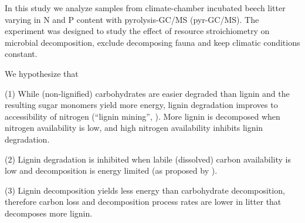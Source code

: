 \documentclass[authoryear,preprint,review,12pt]{elsarticle}
\begin{document}


In this study we analyze samples from climate-chamber incubated beech litter varying in N and P content with pyrolysis-GC/MS (pyr-GC/MS). The experiment was designed to study the effect of resource stroichiometry on microbial decomposition, exclude decomposing fauna and keep climatic conditions constant.

We hypothesize that

(1) While (non-lignified) carbohydrates are easier degraded than lignin and the resulting sugar monomers yield more energy, lignin degradation improves to accessibility of nitrogen (``lignin mining'', \cite{Craine2007}). More lignin is decomposed when nitrogen availability is low, and high nitrogen availability inhibits lignin degradation.

(2) Lignin degradation is inhibited when labile (dissolved) carbon availability is low and decomposition is energy limited (as proposed by \cite{Klotzbucher2011}).

(3) Lignin decomposition yields less energy than carbohydrate decomposition, therefore carbon loss and decomposition process rates are lower in litter that decomposes more lignin.


\end{document}
